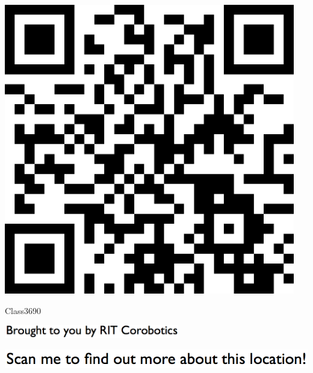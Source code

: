 \documentclass[letterpaper]{article}
\begin{document}
 \begingroup 
 \centerline{\includegraphics[scale=1,width=5in,height=5in]{Class3690.png}} 
 \endgroup 
 \vspace*{\fill} 

 \hfill{\small Class3690} 

  \vspace{0.7in} 
 
 \centerline{\includegraphics[scale=1,width=3in]{text-bottom.png}} 
 
 \pagebreak 
{} 
 \vspace*{\fill} 
 
  \centerline{\includegraphics[scale=1,width=6in]{text-top.png}} 
 
 \vspace{0.5in} 
 
\end{document}
